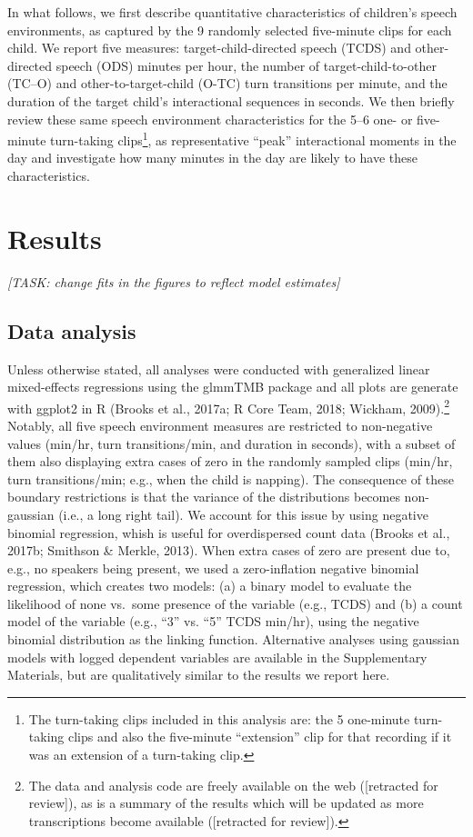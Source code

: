 \documentclass[floatsintext,man]{apa6}
\theoremstyle{definition}
\theoremstyle{definition}
\theoremstyle{definition}
\theoremstyle{remark}
\begin{document}
In what follows, we first describe quantitative characteristics of
children's speech environments, as captured by the 9 randomly selected
five-minute clips for each child. We report five measures:
target-child-directed speech (TCDS) and other-directed speech (ODS)
minutes per hour, the number of target-child-to-other (TC--O) and
other-to-target-child (O-TC) turn transitions per minute, and the
duration of the target child's interactional sequences in seconds. We
then briefly review these same speech environment characteristics for
the 5--6 one- or five-minute turn-taking clips\footnote{The turn-taking
  clips included in this analysis are: the 5 one-minute turn-taking
  clips and also the five-minute \enquote{extension} clip for that
  recording if it was an extension of a turn-taking clip.}, as
representative \enquote{peak} interactional moments in the day and
investigate how many minutes in the day are likely to have these
characteristics.

\section{Results}\label{results}

\emph{{[}TASK: change fits in the figures to reflect model estimates{]}}

\subsection{Data analysis}\label{data-analysis}

Unless otherwise stated, all analyses were conducted with generalized
linear mixed-effects regressions using the glmmTMB package and all plots
are generate with ggplot2 in R (Brooks et al., 2017a; R Core Team, 2018;
Wickham, 2009).\footnote{The data and analysis code are freely available
  on the web ({[}retracted for review{]}), as is a summary of the
  results which will be updated as more transcriptions become available
  ({[}retracted for review{]}).} Notably, all five speech environment
measures are restricted to non-negative values (min/hr, turn
transitions/min, and duration in seconds), with a subset of them also
displaying extra cases of zero in the randomly sampled clips (min/hr,
turn transitions/min; e.g., when the child is napping). The consequence
of these boundary restrictions is that the variance of the distributions
becomes non-gaussian (i.e., a long right tail). We account for this
issue by using negative binomial regression, whish is useful for
overdispersed count data (Brooks et al., 2017b; Smithson \& Merkle,
2013). When extra cases of zero are present due to, e.g., no speakers
being present, we used a zero-inflation negative binomial regression,
which creates two models: (a) a binary model to evaluate the likelihood
of none vs.~some presence of the variable (e.g., TCDS) and (b) a count
model of the variable (e.g., \enquote{3} vs. \enquote{5} TCDS min/hr),
using the negative binomial distribution as the linking function.
Alternative analyses using gaussian models with logged dependent
variables are available in the Supplementary Materials, but are
qualitatively similar to the results we report here.
\end{document}
